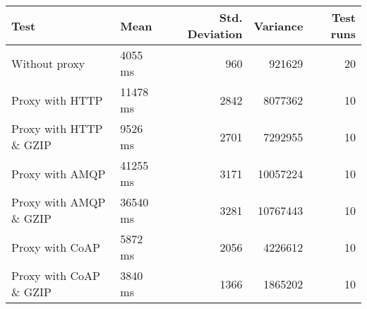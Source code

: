 \begin{tabularx}{\textwidth}{llrrr}
\hline
 Test                   & Mean     &   Std. Deviation &   Variance &   Test runs \\
\hline
 Without proxy          & 4055 ms  &              960 &     921629 &          20 \\
 Proxy with HTTP        & 11478 ms &             2842 &    8077362 &          10 \\
 Proxy with HTTP \& GZIP & 9526 ms  &             2701 &    7292955 &          10 \\
 Proxy with AMQP        & 41255 ms &             3171 &   10057224 &          10 \\
 Proxy with AMQP \& GZIP & 36540 ms &             3281 &   10767443 &          10 \\
 Proxy with CoAP        & 5872 ms  &             2056 &    4226612 &          10 \\
 Proxy with CoAP \& GZIP & 3840 ms  &             1366 &    1865202 &          10 \\
\hline
\end{tabularx}
